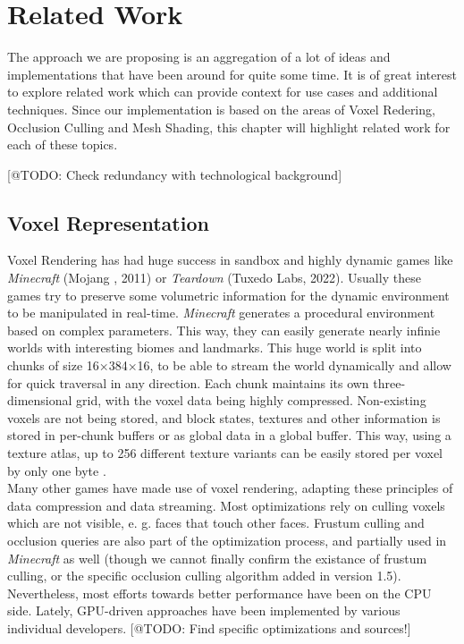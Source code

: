\chapter{Related Work} \label{cpt-related-work}

The approach we are proposing is an aggregation of a lot of ideas and implementations that have been 
around for quite some time. It is of great interest to explore related work which can provide 
context for use cases and additional techniques. Since our implementation is based on the areas 
of Voxel Redering, Occlusion Culling and Mesh Shading, this chapter will highlight related work 
for each of these topics. 


[@TODO: Check redundancy with technological background]

\section{Voxel Representation}

Voxel Rendering has had huge success in sandbox and highly dynamic games like \emph{Minecraft} (Mojang \cite{Mojang2024}, 2011) 
or \emph{Teardown} (Tuxedo Labs, 2022). Usually these games try to preserve some volumetric information for the 
dynamic environment to be manipulated in real-time. \emph{Minecraft} generates a procedural environment based on 
complex parameters. This way, they can easily generate nearly infinie worlds with interesting biomes and 
landmarks. This huge world is split into chunks of size 16×384×16, to be able to stream the world dynamically and 
allow for quick traversal in any direction. Each chunk maintains its own three-dimensional grid, with the voxel 
data being highly compressed. Non-existing voxels are not being stored, and block states, textures and other 
information is stored in per-chunk buffers or as global data in a global buffer. This way, using a texture atlas, 
up to 256 different texture variants can be easily stored per voxel by only one byte 
\cite{Bergensten2012, MinecraftFandom2021}. \\

\noindent
Many other games have made use of voxel rendering, adapting these principles of data compression and data streaming. 
Most optimizations rely on culling voxels which are not visible, e. g. faces that touch other faces.
Frustum culling and occlusion queries are also part of the optimization process, and partially used in \emph{Minecraft} 
as well (though we cannot finally confirm the existance of frustum culling, or the specific occlusion culling 
algorithm added in version 1.5). Nevertheless, most efforts towards better performance have been on the \ac{CPU} side.
Lately, \ac{GPU}-driven approaches have been implemented by various individual developers. [@TODO: Find specific 
optimizations and sources!]  \\


